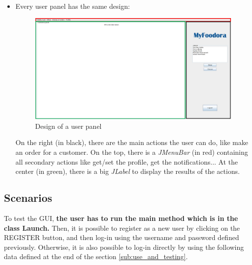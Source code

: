 \begin{itemize}
	\item Every user panel has the same design:
\begin{figure}[H]
	\centering
	\includegraphics[width=0.8\linewidth]{./ima/designUserPanel.jpg}
	\caption{Design of a user panel}
	\label{design_of_user_panel}
\end{figure}
On the right (in black), there are the main actions the user can do, like make an order for a customer. On the top, there is a \textit{JMenuBar} (in red) containing all secondary actions like get/set the profile, get the notifications... At the center (in green), there is a big \textit{JLabel} to display the results of the actions.


\end{itemize}

\subsection{Scenarios}
To test the GUI, \textbf{the user has to run the main method which is in the class Launch.} Then, it is possible to register as a new user by clicking on the REGISTER button, and then log-in using the username and password defined previously. Otherwise, it is also possible to log-in directly by using the following data defined at the end of the section \ref{sub:use_and_testing}.
\label{sub:scenarios}
